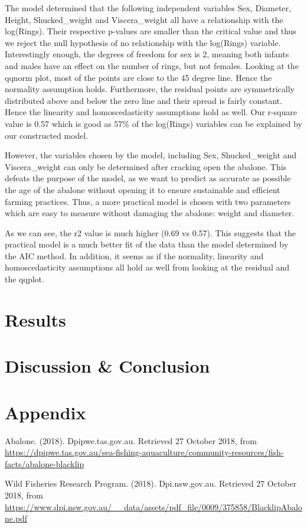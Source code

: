 \documentclass[9pt,twocolumn]{article}
\begin{document}
	The model determined that the following independent variables Sex, Diameter, Height, Shucked\_weight and Viscera\_weight all have a relationship with the log(Rings). Their respective p-values are smaller than the critical value and thus we reject the null hypothesis of no relationship with the log(Rings) variable. Interestingly enough, the degrees of freedom for sex is 2, meaning both infants and males have an effect on the number of rings, but not females. Looking at the qqnorm plot, most of the points are close to the 45 degree line. Hence the normality assumption holds. Furthermore, the residual points are symmetrically distributed above and below the zero line and their spread is fairly constant. Hence the linearity and homoscedasticity assumptions hold as well. Our r-square value is 0.57 which is good as 57\% of the log(Rings) variables can be explained by our constructed model.
	
	However, the variables chosen by the model, including Sex, Shucked\_weight and Viscera\_weight can only be determined after cracking open the abalone. This defeats the purpose of the model, as we want to predict as accurate as possible the age of the abalone without opening it to ensure sustainable and efficient farming practices. Thus, a more practical model is chosen with two parameters which are easy to measure without damaging the abalone: weight and diameter. 
	
	As we can see, the r2 value is much higher (0.69 vs 0.57). This suggests that the practical model is a much better fit of the data than the model determined by the AIC method. In addition, it seems as if the normality, linearity and homoscedasticity assumptions all hold as well from looking at the residual and the qqplot. 
	
	
	\section{Results}
	
	\section{Discussion \& Conclusion}
	
	\section{Appendix}
	
	\begin{thebibliography}{9}
		Abalone. (2018). Dpipwe.tas.gov.au. Retrieved 27 October 2018, from \url{https://dpipwe.tas.gov.au/sea-fishing-aquaculture/community-resources/fish-facts/abalone-blacklip}
		
		Wild Fisheries Research Program. (2018). Dpi.nsw.gov.au. Retrieved 27 October 2018, from		\url{https://www.dpi.nsw.gov.au/__data/assets/pdf_file/0009/375858/BlacklipAbalone.pdf}
	\end{thebibliography}
\end{document}
